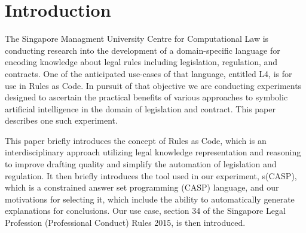 \documentclass[sigconf]{acmart}
\begin{document}



\maketitle

\section{Introduction}
The Singapore Managment University Centre for Computational Law is conducting research into the development
of a domain-specific language for encoding knowledge about legal rules including legislation, regulation,
and contracts. One of the anticipated use-cases of that language, entitled L4, is for use in Rules as Code.
In pursuit of that objective we are conducting experiments designed to ascertain the practical benefits
of various approaches to symbolic artificial intelligence in the domain of legislation and contract. This paper describes one such experiment.

This paper briefly introduces the concept of Rules as Code, which is an interdisciplinary approach utilizing legal knowledge representation and reasoning to improve drafting quality and simplify the automation of legislation and regulation. It then briefly introduces the tool used in our experiment, s(CASP),
which is a constrained answer set programming (CASP) language, and our motivations for selecting it, which include
the ability to automatically generate explanations for conclusions.
Our use case, section 34 of the Singapore Legal Profession (Professional Conduct) Rules 2015, is then introduced.
\end{document}
